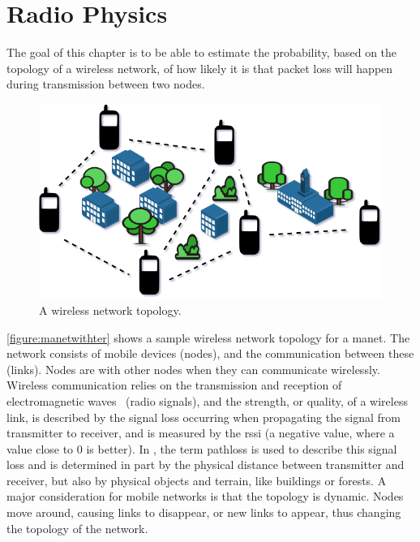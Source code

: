 \chapter{Radio Physics}\label{ch:radio-physics}
The goal of this chapter is to be able to estimate the probability, based on the topology of a wireless
network, of how likely it is that packet loss will happen during transmission between two nodes.


\begin{figure}[ht]
    \centering
    \includegraphics[width=.7\textwidth]{figures/manet_with_terrain.png}
    \caption{A wireless network topology.}
    \label{figure:manetwithter}
\end{figure}

\autoref{figure:manetwithter} shows a sample wireless network topology for a \acrfull{manet}. The network
consists of mobile devices (nodes), and the communication between these (links). Nodes are
 with other nodes when they can communicate wirelessly. Wireless communication relies on
the transmission and reception of electromagnetic waves~\cite[p.~10]{paper:linkmodel} (radio signals), and the
strength, or quality, of a wireless link, is described by the signal loss occurring when propagating the
signal from transmitter to receiver, and is measured by the \gls{rssi} (a negative value, where a value close
to 0 is better). In \cite{paper:linkmodel}, the term \gls{pathloss} is used to describe this signal loss and
is determined in part by the physical distance between transmitter and receiver, but also by physical objects
and terrain, like buildings or forests. A major consideration for mobile networks is that the topology is
dynamic. Nodes move around, causing links to disappear, or new links to appear, thus changing the topology of
the network.\smallbreak

